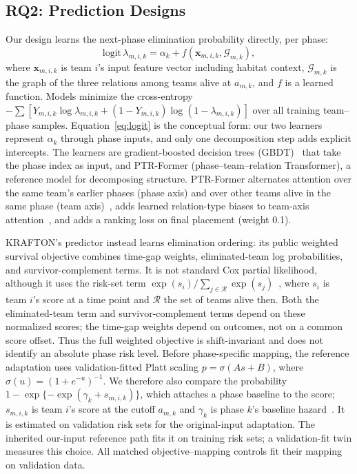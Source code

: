 \documentclass[sigconf,anonymous,nonacm]{acmart}
\begin{document}
\subsection{RQ2: Prediction Designs}
\label{sec:method:rq2}
Our design learns the next-phase elimination probability directly, per phase:
\begin{equation}
\mathrm{logit}\,\lambda_{m,i,k}=\alpha_k+f(\mathbf{x}_{m,i,k},\mathcal{G}_{m,k}),
\label{eq:logit}
\end{equation}
where $\mathbf{x}_{m,i,k}$ is team $i$'s input feature vector including habitat context, $\mathcal{G}_{m,k}$ is the graph of the three relations among teams alive at $a_{m,k}$, and $f$ is a learned function.
Models minimize the cross-entropy $-\sum[Y_{m,i,k}\log\lambda_{m,i,k}+(1-Y_{m,i,k})\log(1-\lambda_{m,i,k})]$ over all training team--phase samples.
Equation~\eqref{eq:logit} is the conceptual form: our two learners represent $\alpha_k$ through phase inputs, and only one decomposition step adds explicit intercepts. The learners are gradient-boosted decision trees (GBDT)~\cite{Friedman01} that take the phase index as input, and PTR-Former (phase--team--relation Transformer), a reference model for decomposing structure.
PTR-Former alternates attention over the same team's earlier phases (phase axis) and over other teams alive in the same phase (team axis)~\cite{Vaswani17}, adds learned relation-type biases to team-axis attention~\cite{Ying21}, and adds a ranking loss on final placement (weight 0.1).

KRAFTON's predictor instead learns elimination ordering: its public weighted survival objective combines time-gap weights, eliminated-team log probabilities, and survivor-complement terms. It is not standard Cox partial likelihood, although it uses the risk-set term $\exp(s_i)/\sum_{j\in\mathcal{R}}\exp(s_j)$~\cite{Cox72}, where $s_i$ is team $i$'s score at a time point and $\mathcal{R}$ the set of teams alive then.
Both the eliminated-team term and survivor-complement terms depend on these normalized scores; the time-gap weights depend on outcomes, not on a common score offset. Thus the full weighted objective is shift-invariant and does not identify an absolute phase risk level. Before phase-specific mapping, the reference adaptation uses validation-fitted Platt scaling $p=\sigma(A s+B)$, where $\sigma(u)=(1+e^{-u})^{-1}$.
We therefore also compare the probability $1-\exp\{-\exp(\gamma_k+s_{m,i,k})\}$, which attaches a phase baseline to the score; $s_{m,i,k}$ is team $i$'s score at the cutoff $a_{m,k}$ and $\gamma_k$ is phase $k$'s baseline hazard~\cite{PrenticeGloeckler78}. It is estimated on validation risk sets for the original-input adaptation. The inherited our-input reference path fits it on training risk sets; a validation-fit twin measures this choice. All matched objective--mapping controls fit their mapping on validation data.
\end{document}
